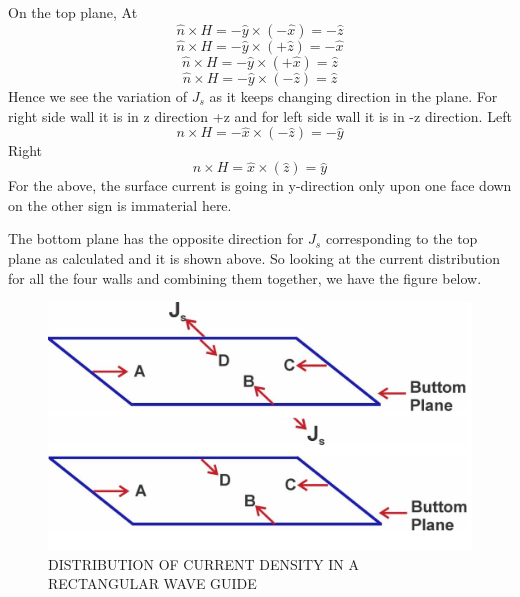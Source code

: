 On the top plane, At
\begin{equation}
   \hat{n} \times H = -\hat{y} \times (-\hat{x})= -\hat{z}
\end{equation}
\begin{equation}
   \hat{n} \times H = -\hat{y} \times (+\hat{z})= -\hat{x}
\end{equation}
\begin{equation}
    \hat{n} \times H = -\hat{y} \times (+\hat{x})= \hat{z}
\end{equation}
\begin{equation}
    \hat{n} \times H = -\hat{y} \times (-\hat{z})= \hat{z}
\end{equation}
Hence we see the variation of $J_{s}$ as it keeps changing direction in the plane. For right side wall it is in z direction +z and for left side wall it is in -z direction.
Left   
\begin{equation}
n\times H = -\hat{x} \times (-\hat{z})= -\hat{y}
\end{equation}
Right  
\begin{equation}
n \times H = \hat{x} \times (\hat{z}) = \hat{y}
\end{equation}
For the above, the surface current is going in y-direction only upon one face down on the other sign is immaterial here.
	
The bottom plane has the opposite direction for $J_{s}$ corresponding to the top plane as calculated and it is shown above. So looking at the current distribution for all the four walls and combining them together, we have the figure below.
\begin{figure}[h]
\centering
\includegraphics[width=1\linewidth]{./graphics/lecture-image-6.jpg}
\caption{DISTRIBUTION OF CURRENT DENSITY IN A RECTANGULAR WAVE GUIDE}
\end{figure}

